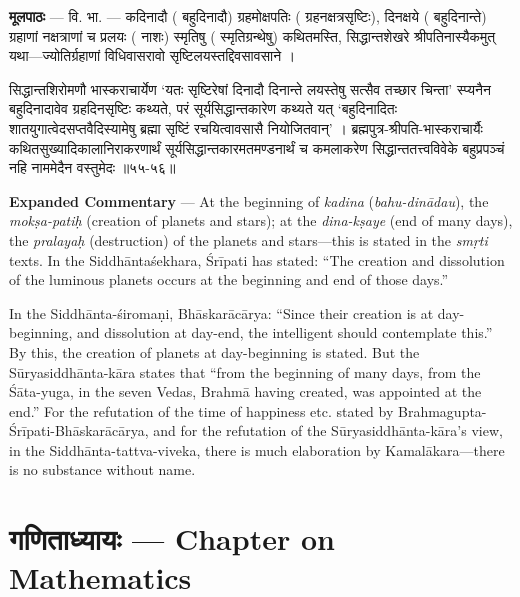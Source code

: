 \documentclass[11pt,a4paper]{article}
\newcommand{\dev}[1]{{\devanagarifont #1}}
\newcommand{\skt}[1]{{\devanagarifont\color{sktcolor} #1}}
\newenvironment{bilingual}{%
  \par\noindent
  \begin{minipage}[t]{0.47\textwidth}%
}{%
  \par\end{minipage}%
}
\newcommand{\rightcol}{%
  \par\end{minipage}%
  \hfill
  \begin{minipage}[t]{0.47\textwidth}%
}
\begin{document}
\begin{bilingual}
\textbf{मूलपाठः} --- \skt{वि. भा. --- कदिनादौ} (\skt{बहुदिनादौ}) \skt{ग्रहमोक्षपतिः} (\skt{ग्रहनक्षत्रसृष्टिः}), \skt{दिनक्षये} (\skt{बहुदिनान्ते}) \skt{ग्रहाणां नक्षत्राणां च प्रलयः} (\skt{नाशः}) \skt{स्मृतिषु} (\skt{स्मृतिग्रन्थेषु}) \skt{कथितमस्ति, सिद्धान्तशेखरे श्रीपतिनास्यैकमुत् यथा---ज्योतिर्ग्रहाणां विधिवासरावो सृष्टिलयस्तद्दिवसावसाने} ।

\skt{सिद्धान्तशिरोमणौ भास्कराचार्येण `यतः सृष्टिरेषां दिनादौ दिनान्ते लयस्तेषु सत्सैव तच्छार चिन्ता' स्प्यनैन बहुदिनादावेव ग्रहदिनसृष्टिः कथ्यते, परं सूर्यसिद्धान्तकारेण कथ्यते यत् `बहुदिनादितः शातयुगात्वेदसप्तवैदिस्यामेषु ब्रह्मा सृष्टिं रचयित्वावसासै नियोजितवान्' । ब्रह्मपुत्र-श्रीपति-भास्कराचार्यैः कथितसुख्यादिकालानिराकरणार्थं सूर्यसिद्धान्तकारमतमण्डनार्थं च कमलाकरेण सिद्धान्ततत्त्वविवेके बहुप्रपञ्चं नहि नाममेदैन वस्तुमेदः} ॥५५-५६॥
\rightcol
\textbf{Expanded Commentary} --- At the beginning of \textit{kadina} (\textit{bahu-dinādau}), the \textit{mokṣa-patiḥ} (creation of planets and stars); at the \textit{dina-kṣaye} (end of many days), the \textit{pralayaḥ} (destruction) of the planets and stars---this is stated in the \textit{smṛti} texts. In the Siddhāntaśekhara, Śrīpati has stated: ``The creation and dissolution of the luminous planets occurs at the beginning and end of those days.''

In the Siddhānta-śiromaṇi, Bhāskarācārya: ``Since their creation is at day-beginning, and dissolution at day-end, the intelligent should contemplate this.'' By this, the creation of planets at day-beginning is stated. But the Sūryasiddhānta-kāra states that ``from the beginning of many days, from the Śāta-yuga, in the seven Vedas, Brahmā having created, was appointed at the end.'' For the refutation of the time of happiness etc. stated by Brahmagupta-Śrīpati-Bhāskarācārya, and for the refutation of the Sūryasiddhānta-kāra's view, in the Siddhānta-tattva-viveka, there is much elaboration by Kamalākara---there is no substance without name.
\end{bilingual}


\newpage
\section[\dev{गणिताध्यायः}]{\dev{गणिताध्यायः} --- Chapter on Mathematics}
\end{document}
